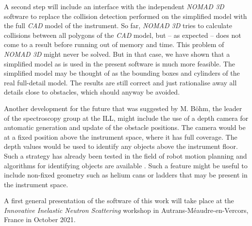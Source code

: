 A second step will include an interface with the independent \textit{NOMAD 3D} \cite{web_NOMAD3d}
software to replace the collision detection performed on the simplified model with the full \textit{CAD}
model \cite{ThalesModel2021} of the instrument.
So far, \textit{NOMAD 3D} tries to calculate collisions between all polygons of the \textit{CAD} model, 
but -- as expected -- does not come to a result before running out of memory and time.
This problem of \textit{NOMAD 3D} might never be solved. 
But in that case, we have shown that a simplified model as is used in the present software is much more 
feasible. 
The simplified model may be thought of as the bounding boxes and cylinders of the real full-detail model.
The results are still correct and just rationalise away all details close to obstacles, which should
anyway be avoided.

Another development for the future that was suggested by M. B\"ohm, the leader of the spectroscopy 
group at the ILL, might include the use of a depth camera for automatic generation and update 
of the obstacle positions. The camera would be at a fixed position above the instrument
space, where it has full coverage. The depth values would be used to identify any objects above the
instrument floor. Such a strategy has already been tested in the field of robot motion planning and 
algorithms for identifying objects are available \cite{Biswas2012}.
Such a feature might be useful to include non-fixed geometry such as helium cans or ladders
that may be present in the instrument space.

A first general presentation of the software of this work will take place at the 
\textit{Innovative Inelastic Neutron Scattering} workshop in Autrans-M\'eaudre-en-Vercors, France 
in October 2021.
